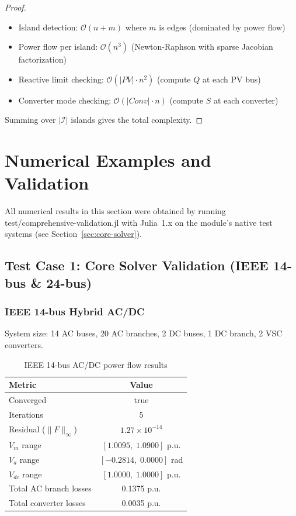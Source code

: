\documentclass[11pt]{article}
\def\file#1{#1}%
\def\_{-}%
\newcommand{\file}[1]{\path{#1}}
\begin{document}
\begin{proof}
\begin{itemize}
    \item Island detection: $\mathcal{O}(n + m)$ where $m$ is edges (dominated by power flow)
    \item Power flow per island: $\mathcal{O}(n^3)$ (Newton-Raphson with sparse Jacobian factorization)
    \item Reactive limit checking: $\mathcal{O}(|PV| \cdot n^2)$ (compute $Q$ at each PV bus)
    \item Converter mode checking: $\mathcal{O}(|Conv| \cdot n)$ (compute $S$ at each converter)
\end{itemize}
Summing over $|\mathcal{I}|$ islands gives the total complexity.
\end{proof}

\section{Numerical Examples and Validation}

All numerical results in this section were obtained by running \file{test/comprehensive\_validation.jl} with Julia~1.x on the module's native test systems (see Section~\ref{sec:core-solver}).

\subsection{Test Case 1: Core Solver Validation (IEEE 14-bus \& 24-bus)}

\subsubsection{IEEE 14-bus Hybrid AC/DC}
System size: 14 AC buses, 20 AC branches, 2 DC buses, 1 DC branch, 2 VSC converters.

\begin{table}[h]
\centering
\caption{IEEE 14-bus AC/DC power flow results}
\begin{tabular}{l c}
\toprule
Metric & Value \\
\midrule
Converged & true \\
Iterations & 5 \\
Residual ($\|F\|_\infty$) & $1.27 \times 10^{-14}$ \\
$V_m$ range & $[1.0095,\; 1.0900]$ p.u. \\
$V_a$ range & $[-0.2814,\; 0.0000]$ rad \\
$V_{dc}$ range & $[1.0000,\; 1.0000]$ p.u. \\
Total AC branch losses & 0.1375 p.u. \\
Total converter losses & 0.0035 p.u. \\
\bottomrule
\end{tabular}
\end{table}
\end{document}
